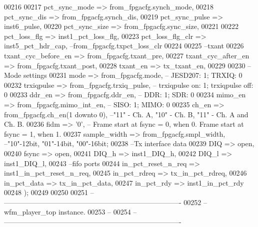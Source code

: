 \begin{DoxyCode}
00216       
00217       pct_sync_mode        => from\_fpgacfg.synch\_mode,
00218       pct_sync_dis         => from\_fpgacfg.synch\_dis,
00219       pct_sync_pulse       => inst6_pulse,
00220       pct_sync_size        => from\_fpgacfg.sync\_size,
00221             
00222       pct_loss_flg         => inst1_pct_loss_flg,
00223       pct_loss_flg_clr     => inst5_pct_hdr_cap,\textcolor{keyword}{ --from\_fpgacfg.txpct\_loss\_clr}
00224       
00225 \textcolor{keyword}{      --txant}
00226       txant_cyc_before_en  => from\_fpgacfg.txant\_pre,
00227       txant_cyc_after_en   => from\_fpgacfg.txant\_post,
00228       txant_en             => tx_txant_en,
00229       
00230 \textcolor{keyword}{      --Mode settings}
00231       mode                 => from\_fpgacfg.mode,\textcolor{keyword}{       -- JESD207: 1; TRXIQ: 0}
00232       trxiqpulse           => from\_fpgacfg.trxiq\_pulse,\textcolor{keyword}{ -- trxiqpulse on: 1; trxiqpulse off: 0}
00233       ddr_en               => from\_fpgacfg.ddr\_en,\textcolor{keyword}{     -- DDR: 1; SDR: 0}
00234       mimo_en              => from\_fpgacfg.mimo\_int\_en,\textcolor{keyword}{    -- SISO: 1; MIMO: 0}
00235       ch_en                => from\_fpgacfg.ch\_en\textcolor{vhdlchar}{(}\textcolor{vhdllogic}{1} \textcolor{keywordflow}{downto} \textcolor{vhdllogic}{0}\textcolor{vhdlchar}{)},\textcolor{keyword}{      --"11" - Ch. A, "10" - Ch. B, "11" - Ch.
       A and Ch. B. }
00236       fidm                 => '0',\textcolor{keyword}{       -- Frame start at fsync = 0, when 0. Frame start at fsync = 1,
       when 1.}
00237       sample_width         => from\_fpgacfg.smpl\_width,\textcolor{keyword}{ --"10"-12bit, "01"-14bit, "00"-16bit;}
00238 \textcolor{keyword}{      --Tx interface data }
00239       DIQ                  => \textcolor{keywordflow}{open},
00240       fsync                => \textcolor{keywordflow}{open}, 
00241       DIQ_h                => inst1_DIQ_h,
00242       DIQ_l                => inst1_DIQ_l,
00243 \textcolor{keyword}{      --fifo ports}
00244       in\_pct\_reset\_n\_req   => inst1_in_pct_reset_n_req,
00245       in\_pct\_rdreq         => tx_in_pct_rdreq,
00246       in_pct_data          => tx_in_pct_data,
00247       in\_pct\_rdy           => inst1_in_pct_rdy
00248       \textcolor{vhdlchar}{)};
00249       
00250       
00251 \textcolor{keyword}{-- ----------------------------------------------------------------------------}
00252 \textcolor{keyword}{-- wfm\_player\_top instance.}
00253 \textcolor{keyword}{-- }
00254 \textcolor{keyword}{-- ----------------------------------------------------------------------------        }

\end{DoxyCode}
